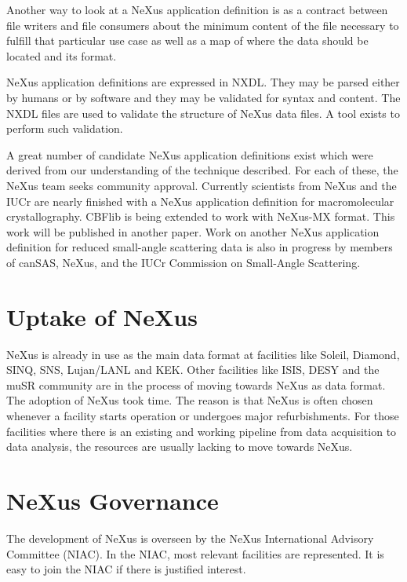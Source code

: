 \documentclass[%
 aip,
rsi,
 amsmath,amssymb,
 reprint,%
]{revtex4-1}
\begin{document}
Another way to look at a NeXus application definition is as a contract between file writers and file consumers 
about the minimum content of the file necessary to fulfill that particular use case as well as a map of where the 
data should be located and its format.

NeXus application definitions are expressed in NXDL.  They may be parsed either by humans or by software and 
they may be validated for syntax and content.  The NXDL files are used to validate the structure of
NeXus data files. A tool exists to perform such validation.%

A great number of candidate NeXus application definitions exist which were derived from our understanding 
of the technique described. For each of these, the NeXus team seeks community approval. 
Currently scientists 
from NeXus and the IUCr are nearly finished with a NeXus application definition for macromolecular crystallography.
CBFlib\cite{cbflib} is being extended to work with NeXus-MX format. This work will be published in another paper. 
Work on another NeXus application definition for reduced small-angle scattering data
is also in progress\cite{cansas}  by members of 
canSAS, NeXus, and the IUCr Commission on Small-Angle Scattering.


\section{Uptake of NeXus} 

NeXus is already in use as the main data format at facilities like Soleil, Diamond, SINQ, SNS, Lujan/LANL 
and KEK. Other facilities like ISIS, DESY and the muSR community are in the process of moving towards 
NeXus as  data format. The adoption of NeXus took time. The reason is that NeXus is often chosen whenever 
a facility starts operation or undergoes major refurbishments. For those facilities where there is an existing and working 
pipeline from data acquisition to data analysis,  the resources are usually lacking to move 
towards NeXus.

\section{NeXus Governance}

The development of NeXus is overseen by the NeXus International Advisory Committee (NIAC). 
In the NIAC, most relevant facilities are represented. It is easy to join the NIAC if 
there is justified interest. 
\end{document}
